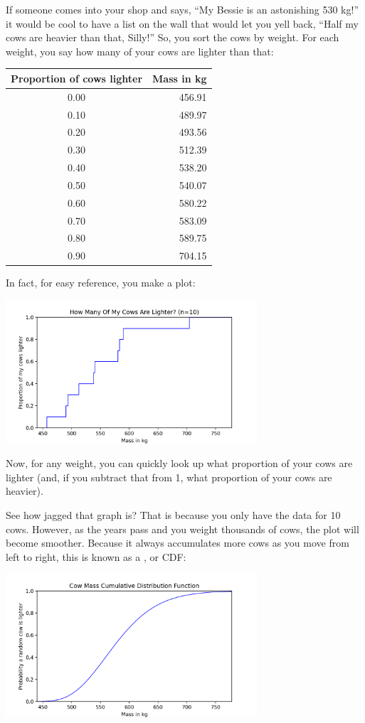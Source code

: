 If someone comes into your shop and says, ``My Bessie is an astonishing 530 kg!'' it would be cool to have a list on the wall that would let you yell back, ``Half my cows are heavier than that, Silly!''  So, you sort the cows by weight.  For each weight,  you say how many of your cows are lighter than that:

\begin{tabular}{c|r}
Proportion of cows lighter & Mass in kg \\
\hline
0.00 & 456.91 \\
0.10 & 489.97 \\
0.20 & 493.56 \\
0.30 & 512.39 \\
0.40 & 538.20 \\
0.50 & 540.07 \\
0.60 & 580.22 \\
0.70 & 583.09 \\
0.80 & 589.75 \\
0.90 & 704.15 \\
\end{tabular}

In fact, for easy reference,  you make a plot:

\includegraphics[width=0.7\textwidth]{cow_sample_cdf.png}

Now, for any weight, you can quickly look up what proportion of your cows are lighter (and, if you subtract that from 1,  what proportion of your cows are heavier).

See how jagged that graph is?  That is because you only have the data for 10 cows. However, as the years pass and you weight thousands of cows, the plot will become smoother. Because it
always accumulates more cows as you move from left to right, this is known as a , or CDF:

\includegraphics[width=0.7\textwidth]{cow_cdf.png}

